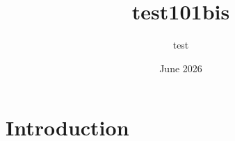 \documentclass{article}
\title{test101bis}
\author{test }
\date{June 2026}
\begin{document}
\maketitle

\section{Introduction}
\end{document}

